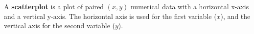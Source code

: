 \documentclass{beamer}
\begin{document}
\begin{frame}
\begin{definition}
A \textbf{scatterplot} is a plot of paired $(x,y)$ numerical data with a horizontal x-axis and a vertical y-axis. The horizontal axis is used for the first variable ($x$), and the vertical axis for the second variable ($y$).
\end{definition}\pause
\begin{example}
\end{example}
\end{frame}
\end{document}
